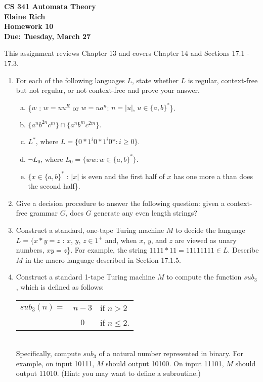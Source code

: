 \documentclass[10pt]{article}
\newcommand{\card}[1]{\left| #1 \right|}
\begin{document}
\begin{center}
\textbf{
CS 341 Automata Theory \\
Elaine Rich \\
Homework 10 \\
Due: Tuesday, March 27}\\
\end{center}
\noindent
This assignment reviews Chapter 13 and covers Chapter 14 and Sections 17.1 - 17.3. \\

\begin{enumerate}[1)]


\item
For each of the following languages $L$, state whether $L$ is regular, context-free but not regular, or not context-free and prove your answer.
\begin{enumerate}[a)]
\item
\{$w$ : $w = uu^R$ or $w = ua^n$: $n = \card{u}$, $u \in \{a, b\}^*$\}.

\item
$\{a^nb^{2n}c^m\} \cap \{a^nb^mc^{2m}\}$.

\item
$L^*$, where $L = \{0*1^i0*1^i0* : i \geq 0\}$.

\item
$\lnot L_0$, where $L_0 = \{ww : w \in \{a, b\}^*\}$.

\item
$\{x \in \{a, b\}^*$ : $\card{x}$ is even and the first half of $x$ has one more a than does the second half\}.
\end{enumerate}


\item
Give a decision procedure to answer the following question: given a context-free grammar $G$, does $G$ generate any even length strings?


\item
Construct a standard, one-tape Turing machine $M$ to decide the language $L = \{x * y = z$ : $x$, $y$, $z \in 1^+$ and, when  $x$,  $y$, and  $z$ are viewed as unary numbers,  $xy =  z$\}.  For example, the string  $1111*11=11111111 \in L$.  Describe $M$ in the macro language described in Section 17.1.5.



\item
Construct a standard 1-tape Turing machine $M$ to compute the function $sub_3$, which is defined as follows:
\begin{tabular}{l c l}
$sub_3(n) =$&$n-3$ &if $n > 2$\\
&$0$&if $n \leq 2$.\\
\end{tabular}\\
Specifically, compute  $sub_3$ of a natural number represented in binary.  For example, on input 10111, $M$ should output 10100.  On input 11101, $M$ should output 11010.  (Hint: you may want to define a subroutine.)
\end{enumerate}
\end{document}
